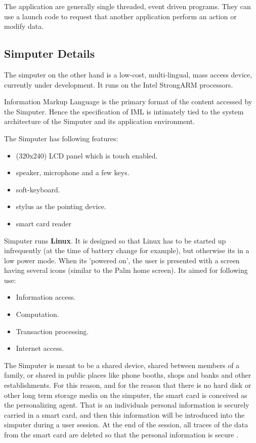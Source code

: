 \documentclass[11pt]{article}
\begin{document}
The application are generally single threaded, event driven programs. They can use a launch code to request that another application perform an action or modify data.

\subsection{Simputer Details}
The simputer on the other hand is a low-cost, multi-lingual, mass access device, currently under development\cite{simpSC}. It runs on the Intel StrongARM processors.

Information Markup Language is the primary format of the content accessed by the Simputer. Hence the  specification of IML is intimately tied to the system architecture of the Simputer and its application environment.

The Simputer has following features:
\begin{itemize}\addtolength{\itemsep}{-0.5\baselineskip}	
\item (320x240) LCD panel which is touch enabled. 
\item speaker, microphone and a few keys. 
\item soft-keyboard. 
\item stylus as the pointing device. 
\item smart card reader
\end{itemize}
 
Simputer runs {\bf Linux}. It is designed so that Linux has to be started up infrequently (at the time of battery change for example), but otherwise its in a low power mode. When its 'powered on', the user is presented with a screen having several icons (similar to the Palm home screen). Its aimed for following use: 
\begin{itemize}\addtolength{\itemsep}{-0.5\baselineskip}   
\item Information access. 
\item Computation. 
\item Transaction processing. 
\item Internet access. 
\end{itemize}

The Simputer is meant to be a shared device, shared between members of a family, or shared in public places like phone booths, shops and banks and other establishments. For this reason, and for the reason that there is no hard disk or other long term storage media on the simputer, the smart card is conceived as the personalizing agent. That is an individuals personal information is securely carried in a smart card, and then this information will be introduced into the simputer during a user session. At the end of the session, all traces of the data from the smart card are deleted so that the personal information is secure \cite{simpSC}.
\end{document}
